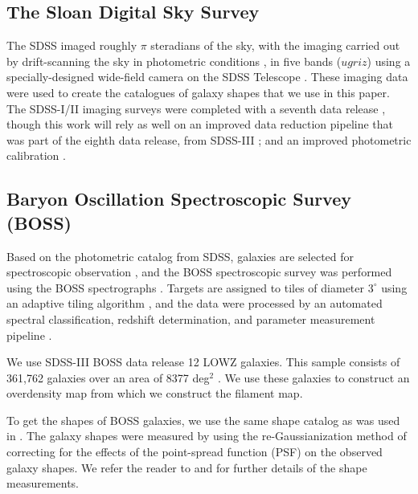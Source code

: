 \documentclass[usenatbib,useAMS]{mnras}
\theoremstyle{remark}
\begin{document}
	\subsection{The Sloan Digital Sky Survey}
		The SDSS 
		\citep{2000AJ....120.1579Y} 
		imaged roughly $\pi$ steradians
		of the sky, 
		with the imaging carried
		out by drift-scanning the sky in photometric conditions
		\citep{2001AJ....122.2129H, 2004AN....325..583I}, in five bands
		($ugriz$) \citep{1996AJ....111.1748F, 2002AJ....123.2121S} using a
		specially-designed wide-field camera
		\citep{1998AJ....116.3040G} on the SDSS Telescope \citep{Gunn2006}. These imaging 
		data were used to create
		the  catalogues of galaxy shapes that we use in this paper. The SDSS-I/II imaging
		surveys were completed with a seventh data release
		\citep{2009ApJS..182..543A}, though this work will rely as well on an
		improved data reduction pipeline that was part of the eighth data
		release, from SDSS-III \citep{2011ApJS..193...29A}; and an improved
		photometric calibration \citep[`ubercalibration',][]{2008ApJ...674.1217P}.

		\subsection{Baryon Oscillation Spectroscopic Survey (BOSS)}
			Based on the photometric catalog from 
			SDSS,  galaxies are selected for spectroscopic observation 
			\citep{Dawson:2013}, and the BOSS spectroscopic survey was performed
			\citep{Ahn:2012} using the BOSS spectrographs \citep{Smee:2013}. Targets
			are assigned to tiles of diameter $3^\circ$ using an adaptive tiling
			algorithm \citep{Blanton:2003}, and the data were processed by an
			automated spectral classification, redshift determination, and parameter
			measurement pipeline \citep{Bolton:2012}.

			We use SDSS-III BOSS data release 12 \citep[DR12;][]{SDSS2015}
			LOWZ galaxies. This sample consists of 361,762 galaxies over an area of 8377 deg$^2$ \citep{2016MNRAS.455.1553R}.
			We use these galaxies to construct
			an overdensity map from which we construct the filament map. 

			To get the shapes of BOSS galaxies, we use the same shape catalog as was used in \cite{Singh2015}. The galaxy shapes were 
			measured by 
			\citet{Reyes2012} using the 
			re-Gaussianization method \citep{Hirata2003} of correcting for the effects of the point-spread function (PSF) on 
			the observed galaxy shapes. We refer the reader to \cite{Singh2015} and \cite{Reyes2012} 
			for further details of the shape measurements.
			
\end{document}
